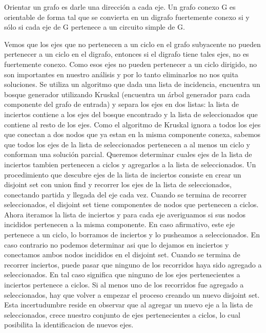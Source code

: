 \begin{center}
Orientar un grafo es darle una dirección a cada eje. Un grafo conexo G es orientable de forma tal que se convierta en un digrafo fuertemente conexo si y sólo si cada eje de G pertenece a un circuito simple de G.
\end{center}
Vemos que los ejes que no pertenecen a un ciclo en el grafo subyacente no pueden pertenecer a un ciclo en el digrafo, entonces si el digrafo tiene tales ejes, no es fuertemente conexo. Como esos ejes no pueden pertenecer a un ciclo dirigido, no son importantes en nuestro análisis y por lo tanto eliminarlos no nos quita soluciones. Se utiliza un algoritmo que dada una lista de incidencia, encuentra un bosque generador utilizando Kruskal (encuentra un árbol generador para cada componente del grafo de entrada) y separa los ejes en dos listas: la lista de inciertos contiene a los ejes del bosque encontrado y la lista de seleccionados que contiene al resto de los ejes. Como el algoritmo de Kruskal ignora a todos los ejes que conectan a dos nodos que ya estan en la misma componente conexa, sabemos que todos los ejes de la lista de seleccionados pertenecen a al menos un ciclo y conforman una solución parcial. Queremos determinar cuales ejes de la lista de inciertos tambien pertenecen a ciclos y agregarlos a la lista de seleccionados. Un procedimiento que descubre ejes de la lista de inciertos consiste en crear un disjoint set con union find y recorrer los ejes de la lista de seleccionados, conectando partida y llegada del eje cada vez. Cuando se termina de recorrer seleccionados, el disjoint set tiene componentes de nodos que pertenecen a ciclos. Ahora iteramos la lista de inciertos y para cada eje averiguamos si sus nodos incididos pertenecen a la misma componente. En caso afirmativo, este eje pertenece a un ciclo, lo borramos de inciertos y lo pusheamos a seleccionados. En caso contrario no podemos determinar asi que lo dejamos en inciertos y conectamos ambos nodos incididos en el disjoint set. Cuando se termina de recorrer inciertos, puede pasar que ninguno de los recorridos haya sido agregado a seleccionados. En tal caso significa que ninguno de los ejes pertenecientes a inciertos pertenece a ciclos. Si al menos uno de los recorridos fue agregado a seleccionados, hay que volver a empezar el proceso creando un nuevo disjoint set. Esta incertudumbre reside en observar que al agregar un nuevo eje a la lista de seleccionados, crece nuestro conjunto de ejes pertenecientes a ciclos, lo cual posibilita la identificacion de nuevos ejes.

